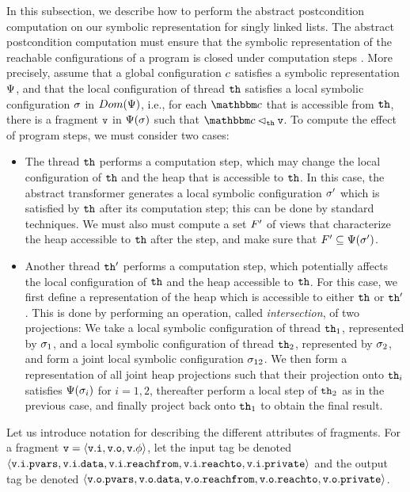 In this subsection, we describe how to perform the abstract postcondition computation on our symbolic representation for singly linked lists. The
abstract postcondition computation must ensure that the symbolic representation
of the reachable configurations of a program is closed under computation
steps .
More precisely, assume that a global configuration $c$ satisfies
a symbolic representation $\Psi$, and that the local configuration
of thread ${\tt th}$ satisfies a local symbolic configuration $\sigma$
in $Dom(\Psi)$, i.e., 
for each $\cell$ that is accessible from ${\tt th}$, there is
  a fragment $\mathtt{v}$ in $\Psi(\sigma)$ such that
  $\cell \lhd_{\thread} \frag$. To compute the effect of program steps, we
  must consider two cases:
\begin{itemize}
\item The thread ${\tt th}$ performs a computation step, which may change the
  local configuration of ${\tt th}$ and the heap that is accessible to
    ${\tt th}$. In this case, the abstract transformer generates
  a local symbolic configuration $\sigma'$
which is satisfied by ${\tt th}$ after its
computation step; this can be done by standard techniques. We must also
must compute a set $F'$ of views that characterize the heap accessible to
${\tt th}$ after the step, and
make sure that $F' \subseteq \Psi(\sigma')$.
\item Another thread ${\tt th}'$ performs a computation step, which potentially affects the
  local configuration of ${\tt th}$ and the heap accessible to ${\tt th}$.
  For this case, we first define a representation of the heap which is
  accessible to either ${\tt th}$ or ${\tt th}'$. This is done by performing an
  operation, called {\em intersection}, of two projections:
  We take a local symbolic configuration of thread ${\tt th}_1$, represented by
  $\sigma_1$, and a
 local symbolic configuration of thread ${\tt th}_2$, represented by
 $\sigma_2$, and form a joint local symbolic configuration
 $\sigma_{12}$. We then form a representation of all joint heap
 projections such that their projection onto ${\tt th}_i$ satisfies
 $\Psi(\sigma_i)$ for $i = 1,2$, thereafter perform a local
 step of ${\tt th}_2$ as in the previous case, and finally project back onto
 ${\tt th}_1$ to obtain the final result.
\end{itemize}
Let us introduce notation for describing the different attributes of
fragments. For a fragment $\mathtt{v} = \left\langle\mathtt{v}.\mathtt{i},\mathtt{v}.\mathtt{o},\mathtt{v}.\phi\right\rangle$,
let the input tag be denoted $\left\langle\mathtt{v}.\mathtt{i}.\mathtt{pvars},\mathtt{v}.\mathtt{i}.\mathtt{data},\mathtt{v}.\mathtt{i}.\mathtt{reachfrom},\mathtt{v}.\mathtt{i}.\mathtt{reachto},\mathtt{v}.\mathtt{i}.\mathtt{private}\right\rangle$ and the output tag
be denoted $\left\langle\mathtt{v}.\mathtt{o}.\mathtt{pvars},\mathtt{v}.\mathtt{o}.\mathtt{data},\mathtt{v}.\mathtt{o}.\mathtt{reachfrom},\mathtt{v}.\mathtt{o}.\mathtt{reachto},\mathtt{v}.\mathtt{o}.\mathtt{private}\right\rangle$.

